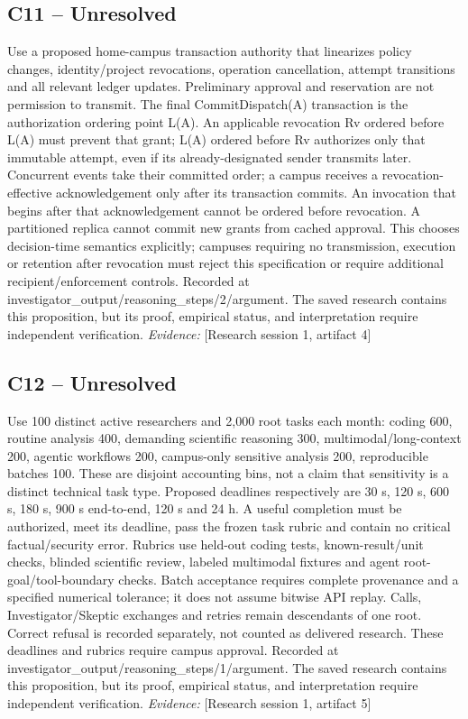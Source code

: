 \documentclass[11pt]{article}
\begin{document}
\subsection{C11 -- Unresolved}
Use a proposed home-campus transaction authority that linearizes policy changes, identity/project revocations, operation cancellation, attempt transitions and all relevant ledger updates. Preliminary approval and reservation are not permission to transmit. The final CommitDispatch(A) transaction is the authorization ordering point L(A). An applicable revocation Rv ordered before L(A) must prevent that grant; L(A) ordered before Rv authorizes only that immutable attempt, even if its already-designated sender transmits later. Concurrent events take their committed order; a campus receives a revocation-effective acknowledgement only after its transaction commits. An invocation that begins after that acknowledgement cannot be ordered before revocation. A partitioned replica cannot commit new grants from cached approval. This chooses decision-time semantics explicitly; campuses requiring no transmission, execution or retention after revocation must reject this specification or require additional recipient/enforcement controls.
Recorded at investigator\_output/reasoning\_steps/2/argument. The saved research contains this proposition, but its proof, empirical status, and interpretation require independent verification.
\textit{Evidence: }[Research session 1, artifact 4]
\subsection{C12 -- Unresolved}
Use 100 distinct active researchers and 2,000 root tasks each month: coding 600, routine analysis 400, demanding scientific reasoning 300, multimodal/long-context 200, agentic workflows 200, campus-only sensitive analysis 200, reproducible batches 100. These are disjoint accounting bins, not a claim that sensitivity is a distinct technical task type. Proposed deadlines respectively are 30 s, 120 s, 600 s, 180 s, 900 s end-to-end, 120 s and 24 h. A useful completion must be authorized, meet its deadline, pass the frozen task rubric and contain no critical factual/security error. Rubrics use held-out coding tests, known-result/unit checks, blinded scientific review, labeled multimodal fixtures and agent root-goal/tool-boundary checks. Batch acceptance requires complete provenance and a specified numerical tolerance; it does not assume bitwise API replay. Calls, Investigator/Skeptic exchanges and retries remain descendants of one root. Correct refusal is recorded separately, not counted as delivered research. These deadlines and rubrics require campus approval.
Recorded at investigator\_output/reasoning\_steps/1/argument. The saved research contains this proposition, but its proof, empirical status, and interpretation require independent verification.
\textit{Evidence: }[Research session 1, artifact 5]
\end{document}
